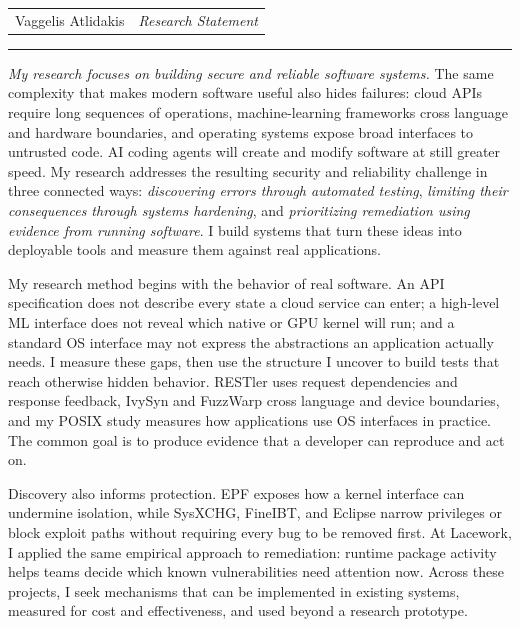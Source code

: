 \documentclass[10pt,letterpaper]{article}
\def\name{\Huge{Vaggelis Atlidakis}\xspace}
\def\type{\LARGE{\textsl{Research Statement}}\xspace}
\begin{document}
\fontsize{10.5pt}{12.4pt}\selectfont

{\centering
\begin{tabularx}{\textwidth}{X r}
  \name & \type \\
\end{tabularx}
{\color{green}\rule{\linewidth}{.25ex}}}
\par\vspace{0.45\baselineskip}

\newcommand*\circled[1]{\tikz[baseline=(char.base)]{
	\node[shape=circle,draw,inner sep=0.75pt] (char) {#1};}}

\noindent
\emph{My research focuses on building secure and reliable software systems.}
The same complexity that makes modern software useful also hides failures:
cloud APIs require long sequences of operations, machine-learning frameworks
cross language and hardware boundaries, and operating systems expose broad
interfaces to untrusted code. AI coding agents will create and modify software
at still greater speed. My research addresses the resulting security and
reliability challenge in three connected ways: \emph{discovering errors through
automated testing}, \emph{limiting their consequences through systems
hardening}, and \emph{prioritizing remediation using evidence from running
software}. I build systems that turn these ideas into deployable tools and
measure them against real applications.

My research method begins with the behavior of real software. An API
specification does not describe every state a cloud service can enter; a
high-level ML interface does not reveal which native or GPU kernel will run;
and a standard OS interface may not express the abstractions an application
actually needs. I measure these gaps, then use the structure I uncover to
build tests that reach otherwise hidden behavior. RESTler uses request
dependencies and response feedback, IvySyn and FuzzWarp cross language and
device boundaries, and my POSIX study measures how applications use OS
interfaces in practice. The common goal is to produce evidence that a
developer can reproduce and act on.

Discovery also informs protection. EPF exposes how a kernel interface can
undermine isolation, while SysXCHG, FineIBT, and Eclipse narrow privileges or
block exploit paths without requiring every bug to be removed first. At
Lacework, I applied the same empirical approach to remediation: runtime
package activity helps teams decide which known vulnerabilities need
attention now. Across these projects, I seek mechanisms that can be
implemented in existing systems, measured for cost and effectiveness, and
used beyond a research prototype.
\end{document}
